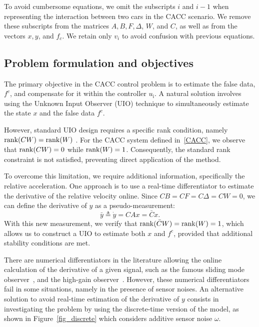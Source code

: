 {%
To avoid cumbersome equations, we omit the subscripts $i$ and $i-1$ when representing the interaction between two cars in the CACC scenario. We remove these subscripts from the matrices $A, B, F, \Delta$, $W$, and $C$, as well as from the vectors $x, y$, and $f_{c}$. We retain only $v_i$ to avoid confusion with previous equations.







\subsection{Problem formulation and objectives}\label{formulation}

The primary objective in the CACC control problem is to estimate the false data, $f^c$, and compensate for it within the controller $u_{\text{i}}$. A natural solution involves using the Unknown Input Observer (UIO) technique to simultaneously estimate the state $x$ and the false data $f^{c}$.

However, standard UIO design requires a specific rank condition, namely $\mathop{{\rm rank}}(C W) = \mathop{{\rm rank}}(W)$ \cite{chaouche2022unknown,trinh2011functional}. For the CACC system defined in~\eqref{CACC}, we observe that $\mathop{{\rm rank}}(C W) = 0$ while $\mathop{{\rm rank}}(W) = 1$. Consequently, the standard rank constraint is not satisfied, preventing direct application of the method.

To overcome this limitation, we require additional information, specifically the relative acceleration. One approach is to use a real-time differentiator to estimate the derivative of the relative velocity online. Since $CB = CF = C\Delta = CW = 0$, we can define the derivative of $y$ as a pseudo-measurement:
\begin{equation}\label{ali_e4}
\bar{y} \triangleq \dot{y} = CA x = \bar{C} x.
\end{equation}
With this new measurement, we verify that $\mathop{{\rm rank}}(\bar{C} W) = \mathop{{\rm rank}}(W) = 1$, which allows us to construct a UIO to estimate both $x$ and $f^c$, provided that additional stability conditions are met.



There are numerical differentiators in the literature allowing the online calculation of the derivative of a given signal, such as the famous sliding mode observer~\cite{sliding_diff_zhu}, and the high-gain observer~\cite{Khalil}. However, these numerical differentiators fail in some situations, namely in the presence of sensor noises. An alternative solution to avoid real-time estimation of the derivative of $y$ consists in investigating the problem by using the discrete-time version of the model, as shown in Figure~\ref{fig_discrete} which considers additive sensor noise $\omega$. 

}
